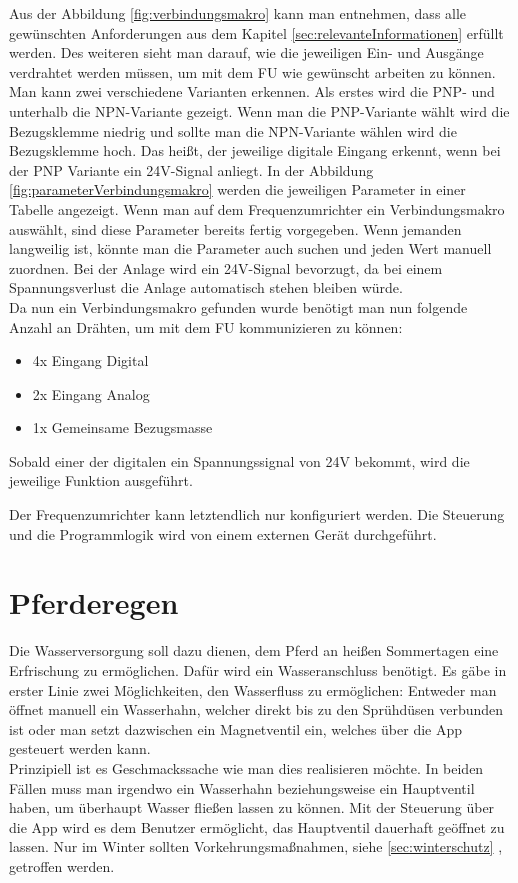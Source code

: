 Aus der Abbildung \ref{fig:verbindungsmakro} kann man entnehmen, dass alle gewünschten Anforderungen aus dem Kapitel \ref{sec:relevanteInformationen} erfüllt werden. Des weiteren sieht man darauf, wie die jeweiligen Ein- und Ausgänge verdrahtet werden müssen, um mit dem \ac{FU} wie gewünscht arbeiten zu können. Man kann zwei verschiedene Varianten erkennen. Als erstes wird die PNP- und unterhalb die NPN-Variante gezeigt. Wenn man die PNP-Variante wählt wird die Bezugsklemme niedrig und sollte man die NPN-Variante wählen wird die Bezugsklemme hoch. Das heißt, der jeweilige digitale Eingang erkennt, wenn bei der PNP Variante ein 24V-Signal anliegt. In der Abbildung \ref{fig:parameterVerbindungsmakro} werden die jeweiligen Parameter in einer Tabelle angezeigt. Wenn man auf dem Frequenzumrichter ein Verbindungsmakro auswählt, sind diese Parameter bereits fertig vorgegeben. Wenn jemanden langweilig ist, könnte man die Parameter auch suchen und jeden Wert manuell zuordnen. Bei der Anlage wird ein 24V-Signal bevorzugt, da bei einem Spannungsverlust die Anlage automatisch stehen bleiben würde. \\

Da nun ein Verbindungsmakro gefunden wurde benötigt man nun folgende Anzahl an Drähten, um mit dem \ac{FU} kommunizieren zu können:

\begin{itemize}
	\item{4x Eingang Digital}
	\item{2x Eingang Analog}
	\item{1x Gemeinsame Bezugsmasse}
\end{itemize}

Sobald einer der digitalen ein Spannungssignal von 24V bekommt, wird die jeweilige Funktion ausgeführt. \newline{}

Der Frequenzumrichter kann letztendlich nur konfiguriert werden. Die Steuerung und die Programmlogik wird von einem externen Gerät durchgeführt. 

\newpage
\section{Pferderegen}
\label{sec:pferderegen}

Die Wasserversorgung soll dazu dienen, dem Pferd an heißen Sommertagen eine Erfrischung zu ermöglichen. Dafür wird ein Wasseranschluss benötigt. Es gäbe in erster Linie zwei Möglichkeiten, den Wasserfluss zu ermöglichen: Entweder man öffnet manuell ein Wasserhahn, welcher direkt bis zu den Sprühdüsen verbunden ist oder man setzt dazwischen ein Magnetventil ein, welches über die App gesteuert werden kann. \\
Prinzipiell ist es Geschmackssache wie man dies realisieren möchte. In beiden Fällen muss man irgendwo ein Wasserhahn beziehungsweise ein Hauptventil haben, um überhaupt Wasser fließen lassen zu können. 
Mit der Steuerung über die App wird es dem Benutzer ermöglicht, das Hauptventil dauerhaft geöffnet zu lassen. Nur im Winter sollten 
Vorkehrungsmaßnahmen, siehe \ref{sec:winterschutz} , getroffen werden. 

